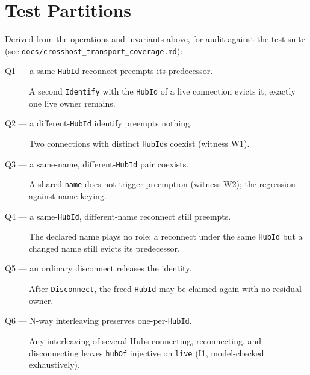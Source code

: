\documentclass[a4paper,10pt,fleqn]{article}
\begin{document}
\section{Test Partitions}
\label{sec:partitions}

Derived from the operations and invariants above, for audit against the
test suite (see \texttt{docs/crosshost\_transport\_coverage.md}):

\begin{description}
  \item[Q1 --- a same-\texttt{HubId} reconnect preempts its predecessor.]
    A second \texttt{Identify} with the \texttt{HubId} of a live
    connection evicts it; exactly one live owner remains.
  \item[Q2 --- a different-\texttt{HubId} identify preempts nothing.] Two
    connections with distinct \texttt{HubId}s coexist (witness W1).
  \item[Q3 --- a same-name, different-\texttt{HubId} pair coexists.] A
    shared \texttt{name} does not trigger preemption (witness W2); the
    regression against name-keying.
  \item[Q4 --- a same-\texttt{HubId}, different-name reconnect still
    preempts.] The declared name plays no role: a reconnect under the
    same \texttt{HubId} but a changed name still evicts its predecessor.
  \item[Q5 --- an ordinary disconnect releases the identity.] After
    \texttt{Disconnect}, the freed \texttt{HubId} may be claimed again
    with no residual owner.
  \item[Q6 --- N-way interleaving preserves one-per-\texttt{HubId}.] Any
    interleaving of several Hubs connecting, reconnecting, and
    disconnecting leaves \texttt{hubOf} injective on \texttt{live} (I1,
    model-checked exhaustively).
\end{description}
\end{document}
